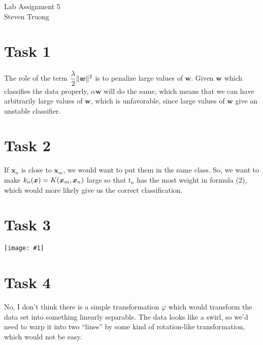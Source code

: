 \documentclass{article}
\newcommand{\image}[2]{\begin{center}\texttt{[image: \#1]}\end{center}}
\renewcommand{\vec}[1]{\boldsymbol{#1}}
\renewcommand{\phi}{\varphi}
\DeclarePairedDelimiter{\p}{(}{)}
\DeclarePairedDelimiter{\norm}{\Vert}{\Vert}
\begin{document}
{\huge Lab Assignment 5} \\	
\large Steven Truong \\

\normalsize

\section*{Task 1}
The role of the term $\dfrac{\lambda}{2}\norm{\vec{w}}^2$ is to penalize large values of $\vec{w}$. Given $\vec{w}$ which classifies the data properly, $\alpha\vec{w}$ will do the same, which means that we can have arbitrarily large values of $\vec{w}$, which is unfavorable, since large values of $\vec{w}$ give an unstable classifier.

\section*{Task 2}
If $\vec{x}_n$ is close to $\vec{x}_m$, we would want to put them in the same class. So, we want to make $k_n\p{\vec{x}} = K\p{\vec{x}_m, \vec{x}_n}$ large so that $t_n$ has the most weight in formula (2), which would more likely give us the correct classification.

\section*{Task 3}
\image{images/projection.png}{1}

\pagebreak
\section*{Task 4}
No, I don't think there is a simple transformation $\phi$ which would transform the data set into something linearly separable. The data looks like a swirl, so we'd need to warp it into two ``lines'' by some kind of rotation-like transformation, which would not be easy.
\end{document}
